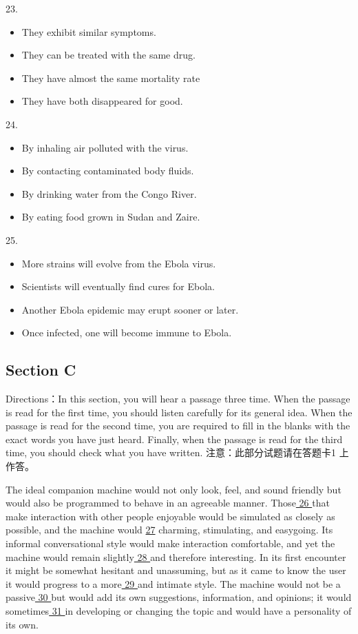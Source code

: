 \documentclass[UTF8,11pt]{ctexart}
\begin{document}
23.


\begin{itemize}[leftmargin=2em,itemsep=.2em,topsep=.4em]\item[A.] They exhibit similar symptoms.
\item[B.] They can be treated with the same drug.
\item[C.] They have almost the same mortality rate
\item[D.] They have both disappeared for good.
\end{itemize}

24.


\begin{itemize}[leftmargin=2em,itemsep=.2em,topsep=.4em]\item[A.] By inhaling air polluted with the virus.
\item[B.] By contacting contaminated body fluids.
\item[C.] By drinking water from the Congo River.
\item[D.] By eating food grown in Sudan and Zaire.
\end{itemize}

25.


\begin{itemize}[leftmargin=2em,itemsep=.2em,topsep=.4em]\item[A.] More strains will evolve from the Ebola virus.
\item[B.] Scientists will eventually find cures for Ebola.
\item[C.] Another Ebola epidemic may erupt sooner or later.
\item[D.] Once infected, one will become immune to Ebola.
\end{itemize}

\subsection*{\textbf{Section C}}


Directions：In this section, you will hear a passage three time. When the passage is read for the first time, you should listen carefully for its general idea. When the passage is read for the second time, you are required to fill in the blanks with the exact words you have just heard. Finally, when the passage is read for the third time, you should check what you have written. 注意：此部分试题请在答题卡1 上作答。


The ideal companion machine would not only look, feel, and sound friendly but would also be programmed to behave in an agreeable manner. Those\uline{ 26 }that make interaction with other people enjoyable would be simulated as closely as possible, and the machine would \uline{27} charming, stimulating, and easygoing. Its informal conversational style would make interaction comfortable, and yet the machine would remain slightly\uline{ 28 }and therefore interesting. In its first encounter it might be somewhat hesitant and unassuming, but as it came to know the user it would progress to a more\uline{ 29 }and intimate style. The machine would not be a passive\uline{ 30 }but would add its own suggestions, information, and opinions; it would sometimes\uline{ 31 }in developing or changing the topic and would have a personality of its own.
\end{document}

